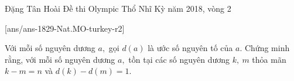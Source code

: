 
\begin{name}
{Đặng Tân Hoài}
{Đề thi Olympic Thổ Nhĩ Kỳ năm 2018, vòng 2}
\end{name}
\setcounter{ex}{0}
[ans/ans-1829-Nat.MO-turkey-r2]
\begin{ex}%
	Với mỗi số nguyên dương $a,$ gọi $d(a)$ là ước số nguyên tố của $a.$ Chứng minh rằng, với mỗi số nguyên dương $a,$ tồn tại các số nguyên dương $k,~m$ thỏa mãn $k-m=n$ và $d(k)-d(m)=1.$
\end{ex}
